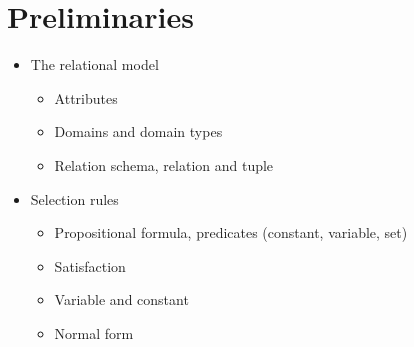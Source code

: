 \section{Preliminaries}
\label{sec:preliminaries}

\begin{itemize}
    \item The relational model
    \begin{itemize}
        \item Attributes
        \item Domains and domain types
        \item Relation schema, relation and tuple
    \end{itemize}
    \item Selection rules
    \begin{itemize}
        \item Propositional formula, predicates (constant, variable, set)
        \item Satisfaction
        \item Variable and constant
        \item Normal form
    \end{itemize}
\end{itemize}